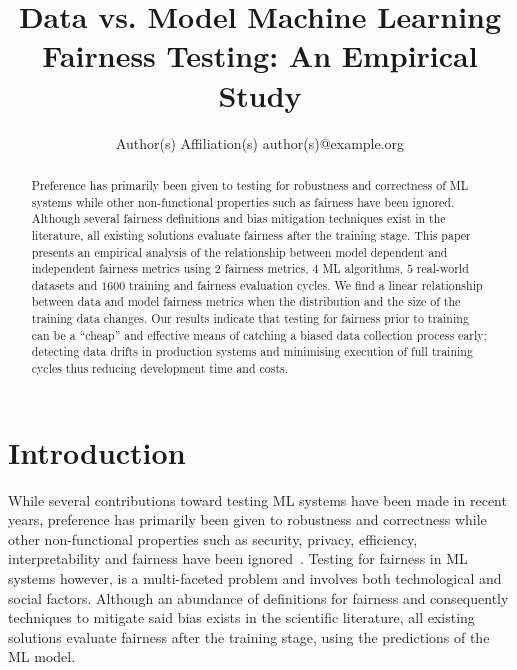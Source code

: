 \documentclass{article}
\title{Data vs. Model Machine Learning Fairness Testing: An Empirical Study}
\author{
Author(s)
\affiliations
Affiliation(s)
\emails
author(s)@example.org
}
\begin{document}
\maketitle

\begin{abstract}

  Preference has primarily been given to testing for robustness and
  correctness of ML systems while other non-functional properties such
  as fairness have been ignored. Although several fairness definitions
  and bias mitigation techniques exist in the literature, all existing
  solutions evaluate fairness after the training stage. This paper
  presents an empirical analysis of the relationship between model
  dependent and independent fairness metrics using $2$ fairness
  metrics, $4$ ML algorithms, $5$ real-world datasets and $1600$
  training and fairness evaluation cycles. We find a linear
  relationship between data and model fairness metrics when the
  distribution and the size of the training data changes. Our results
  indicate that testing for fairness prior to training can be a
  ``cheap'' and effective means of catching a biased data collection
  process early; detecting data drifts in production systems and
  minimising execution of full training cycles thus reducing
  development time and costs.

\end{abstract}

\section{Introduction}\label{sec:intro}




While several contributions toward testing ML systems have been made
in recent years, preference has primarily been given to robustness and
correctness while other non-functional properties such as security,
privacy, efficiency, interpretability and fairness have been
ignored \cite{zhang2020machine,zhang2021ignorance,mehrabi2021survey,wan2021modeling}. Testing
for fairness in ML systems however, is a multi-faceted problem and
involves both technological and social factors. Although an abundance
of definitions for fairness and consequently techniques to mitigate
said bias exists in the scientific literature, all existing solutions
evaluate fairness after the training stage, using the predictions of
the ML model.
\end{document}
